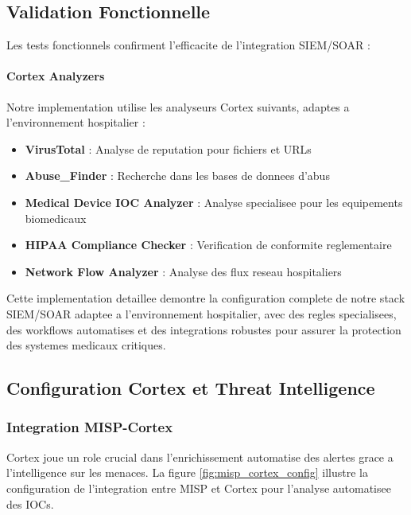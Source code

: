 \subsection{Validation Fonctionnelle}

Les tests fonctionnels confirment l'efficacite de l'integration SIEM/SOAR :

\paragraph{Cortex Analyzers}

Notre implementation utilise les analyseurs Cortex suivants, adaptes a l'environnement hospitalier :

\begin{itemize}
    \item \textbf{VirusTotal} : Analyse de reputation pour fichiers et URLs
    \item \textbf{Abuse\_Finder} : Recherche dans les bases de donnees d'abus
    \item \textbf{Medical Device IOC Analyzer} : Analyse specialisee pour les equipements biomedicaux
    \item \textbf{HIPAA Compliance Checker} : Verification de conformite reglementaire
    \item \textbf{Network Flow Analyzer} : Analyse des flux reseau hospitaliers
\end{itemize}

Cette implementation detaillee demontre la configuration complete de notre stack SIEM/SOAR adaptee a l'environnement hospitalier, avec des regles specialisees, des workflows automatises et des integrations robustes pour assurer la protection des systemes medicaux critiques.

\subsection{Configuration Cortex et Threat Intelligence}

\subsubsection{Integration MISP-Cortex}

Cortex joue un role crucial dans l'enrichissement automatise des alertes grace a l'intelligence sur les menaces. La figure \ref{fig:misp_cortex_config} illustre la configuration de l'integration entre MISP et Cortex pour l'analyse automatisee des IOCs.


